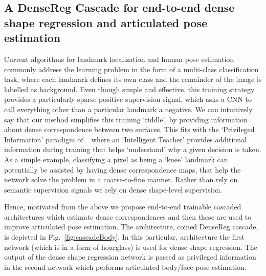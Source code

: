 \subsection{A DenseReg Cascade for end-to-end dense shape regression and articulated pose estimation}
\label{sec: densereg_cascade}

Current algorithms for landmark localization and human pose estimation commonly address the learning problem in the form of a multi-class classification task, where each landmark defines its own class and the remainder of the image is labelled as background. Even though simple and effective, this training strategy provides a particularly sparse positive supervision signal, which asks a CNN to call everything other than a particular landmark a negative. We can intuitively say that our method simplifies this training `riddle', by providing information about dense correspondence between two surfaces. This fits  with the `Privileged Information' paradigm of ~\cite{VapnikV09} where an `Intelligent Teacher' provides additional information during training that helps `understand' why a given  decision is taken. As a simple example, classifying a pixel as being a `knee' landmark can potentially be assisted by having dense correspondence maps, that  help the network solve the problem in a coarse-to-fine manner. Rather than rely on semantic supervision signals  we  rely on dense shape-level supervision.
    
Hence, motivated from the above we propose end-to-end trainable cascaded architectures which estimate dense correspondences and then these are used to improve articulated pose estimation. The architecture, coined DenseReg cascade, is depicted in Fig.~\ref{fig:cascadeBody}. In this particular, architecture the first network (which is in a form of hourglass) is used for dense shape regression. The output of the dense shape regression network is passed as privileged information in the second network which performs articulated body/face pose estimation. 


